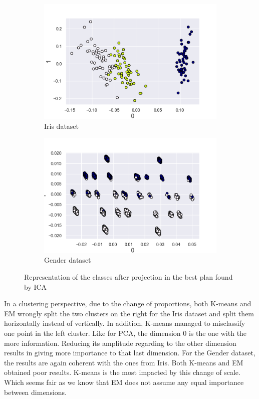 \documentclass[twocolumn, 10pt]{article}
\begin{document}
			\begin{figure}[h]
				\centering
				\begin{subfigure}[t]{0.49\columnwidth}
					\centering
					\includegraphics[width=\linewidth]{../graphics/ica_iris_0_1_label.png}
					\caption{Iris dataset}
					\label{fig:ica_iris}
				\end{subfigure}
				\begin{subfigure}[t]{0.49\columnwidth}
					\centering
					\includegraphics[width=\linewidth]{../graphics/ica_g_0_1_label.png}
					\caption{Gender dataset}
					\label{fig:ica_g}
				\end{subfigure}
				\caption{Representation of the classes after projection in the best plan found by ICA}
				\label{fig:ica}
			\end{figure}

			In a clustering perspective, due to the change of proportions, both K-means and EM wrongly split the two clusters on the right for the Iris dataset and split them horizontally instead of vertically. In addition, K-means managed to misclassify one point in the left cluster. Like for PCA, the dimension 0 is the one with the more information. Reducing its amplitude regarding to the other dimension results in giving more importance to that last dimension. For the Gender dataset, the results are again coherent with the ones from Iris. Both K-means and EM obtained poor results. K-means is the most impacted by this change of scale. Which seems fair as we know that EM does not assume any equal importance between dimensions.
\end{document}
